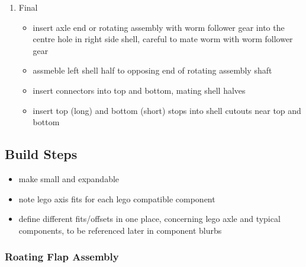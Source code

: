\documentclass[11pt]{article}
\begin{document}
\begin{enumerate}
\item Final
\label{sec:orgbd77c32}
\begin{itemize}
\item insert axle end or rotating assembly with worm follower gear into the centre hole in right side shell, careful to mate worm with worm follower gear
\item assmeble left shell half to opposing end of rotating assembly shaft
\item insert connectors into top and bottom, mating shell halves
\item insert top (long) and bottom (short) stops into shell cutouts near top and bottom
\end{itemize}
\end{enumerate}

\subsection{Build Steps}
\label{sec:org10aaa21}
\begin{itemize}
\item make small and expandable
\item note lego axis fits for each lego compatible component
\item define different fits/offsets in one place, concerning lego axle and typical components, to be referenced later in component blurbs
\end{itemize}

\subsubsection{Roating Flap Assembly}
\label{sec:org369ddd9}
\end{document}
